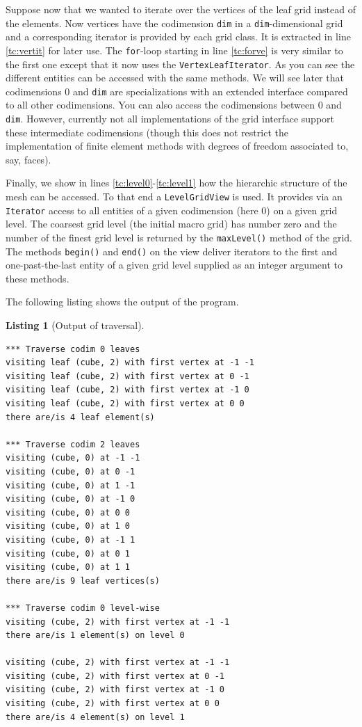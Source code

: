 \documentclass[11pt,a4paper,headinclude,footinclude,DIV16,normalheadings]{scrreprt}
\newtheorem{lst}{Listing}
\begin{document}
Suppose now that we wanted to iterate over the vertices of the leaf
grid instead of the elements. Now vertices have the codimension
\lstinline!dim! in a \lstinline!dim!-dimensional grid and a
corresponding iterator is provided by each grid class. It is extracted
in line \ref{tc:vertit} for later use. The \lstinline!for!-loop
starting in line \ref{tc:forve} is very similar to the first one
except that it now uses the \lstinline!VertexLeafIterator!.  As you
can see the different entities can be accessed with the same methods.
We will see later that codimensions 0 and \lstinline!dim! are
specializations with an extended interface compared to all other
codimensions. You can also access the codimensions between 0 and
\lstinline!dim!. However, currently not all implementations of the
grid interface support these intermediate codimensions (though this
does not restrict the implementation of finite element methods with
degrees of freedom associated to, say, faces).

Finally, we show in lines \ref{tc:level0}-\ref{tc:level1} how the
hierarchic structure of the mesh can be accessed. To that end a
\lstinline!LevelGridView! is used. It provides via an \lstinline!Iterator!
access to all entities of a given codimension (here 0) on a given grid level.
The coarsest
grid level (the initial macro grid) has number zero and the number of
the finest grid level is returned by the \lstinline!maxLevel()! method
of the grid.  The methods \lstinline!begin()! and \lstinline!end()!
on the view deliver iterators to the first and one-past-the-last
entity of a given grid level supplied as an integer argument to these
methods.

The following listing shows the output of the program.

\begin{lst}[Output of traversal] \mbox{}

\begin{lstlisting}[basicstyle=\ttfamily\scriptsize]
*** Traverse codim 0 leaves
visiting leaf (cube, 2) with first vertex at -1 -1
visiting leaf (cube, 2) with first vertex at 0 -1
visiting leaf (cube, 2) with first vertex at -1 0
visiting leaf (cube, 2) with first vertex at 0 0
there are/is 4 leaf element(s)

*** Traverse codim 2 leaves
visiting (cube, 0) at -1 -1
visiting (cube, 0) at 0 -1
visiting (cube, 0) at 1 -1
visiting (cube, 0) at -1 0
visiting (cube, 0) at 0 0
visiting (cube, 0) at 1 0
visiting (cube, 0) at -1 1
visiting (cube, 0) at 0 1
visiting (cube, 0) at 1 1
there are/is 9 leaf vertices(s)

*** Traverse codim 0 level-wise
visiting (cube, 2) with first vertex at -1 -1
there are/is 1 element(s) on level 0

visiting (cube, 2) with first vertex at -1 -1
visiting (cube, 2) with first vertex at 0 -1
visiting (cube, 2) with first vertex at -1 0
visiting (cube, 2) with first vertex at 0 0
there are/is 4 element(s) on level 1
\end{lstlisting}
\end{lst}
\end{document}
